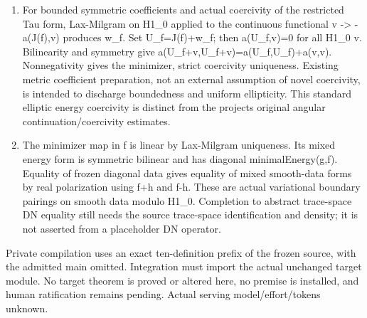 \documentclass[11pt]{article}
\theoremstyle{definition}
\theoremstyle{remark}
\numberwithin{equation}{section}
\begin{document}
\begin{enumerate}
  If the quadratic form is nonnegative on all H1 elements, its image is
  bounded below by0. The existing sInf\_image\_closure\_eq then equates
  the frozen real infimum with the actual affine H1\_0 infimum. No
  smooth minimizer or exterior extension of a minimizer is required.
\item
  For bounded symmetric coefficients and actual coercivity of the
  restricted Tau form, Lax-Milgram on H1\_0 applied to the continuous
  functional v -\textgreater{} -a(J(f),v) produces w\_f. Set
  U\_f=J(f)+w\_f; then a(U\_f,v)=0 for all H1\_0 v. Bilinearity and
  symmetry give a(U\_f+v,U\_f+v)=a(U\_f,U\_f)+a(v,v). Nonnegativity
  gives the minimizer, strict coercivity uniqueness. Existing metric
  coefficient preparation, not an external assumption of novel
  coercivity, is intended to discharge boundedness and uniform
  ellipticity. This standard elliptic energy coercivity is distinct from
  the project\textquotesingle s original angular continuation/coercivity
  estimates.
\item
  The minimizer map in f is linear by Lax-Milgram uniqueness. Its mixed
  energy form is symmetric bilinear and has diagonal minimalEnergy(g,f).
  Equality of frozen diagonal data gives equality of mixed smooth-data
  forms by real polarization using f+h and f-h. These are actual
  variational boundary pairings on smooth data modulo H1\_0. Completion
  to abstract trace-space DN equality still needs the source trace-space
  identification and density; it is not asserted from a placeholder DN
  operator.
\end{enumerate}

Private compilation uses an exact ten-definition prefix of the frozen
source, with the admitted main omitted. Integration must import the
actual unchanged target module. No target theorem is proved or altered
here, no premise is installed, and human ratification remains pending.
Actual serving model/effort/tokens unknown.
\end{document}
